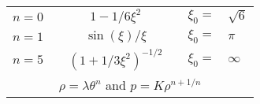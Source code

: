 \begin{frame}
	\begin{figure}
		\centering
		\begin{tabular}[b]{@{}lcccrl@{}}
			\toprule
			$n=0$ && $\displaystyle 1-1/6\xi^2$ && $\xi_0=$&$\sqrt{6}$\\[1ex]
			$n=1$ && $\displaystyle \sin(\xi)/\xi$ && $\xi_0=$&$\pi$\\[1ex]
			$n=5$ && $\displaystyle \left(1+1/3\xi^2\right)^{-1/2}$ && $\xi_0=$&$\infty$\\[1ex]
			\multicolumn{6}{c}{$\rho=\lambda\theta^n$ and $p=K\rho^{n+1/n}$}\\[1ex]
			\bottomrule
		\end{tabular}
	\end{figure}
\end{frame}

